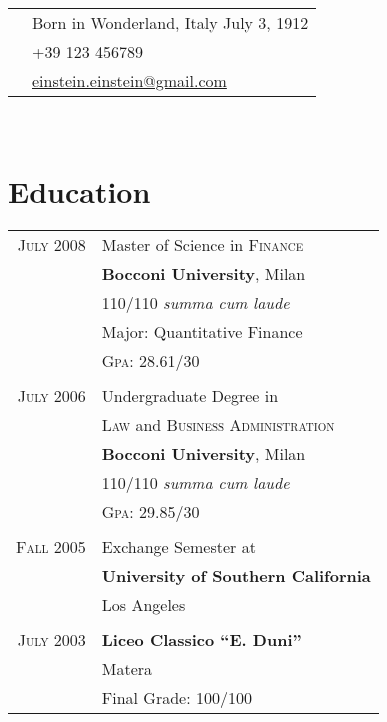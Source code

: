 \documentclass[10pt]{article}
\begin{document}
{\begin{minipage}[t]{0.5\textwidth}
\end{minipage} %
\hfill
\begin{minipage}[t]{0.44\textwidth} %
	
	\vspace{0pt} %
	
\colorbox{shade}{\textcolor{text1}{
	\begin{tabular}{c|p{6.8cm}}
								& Born in Wonderland, Italy July 3, 1912 \\
		\raisebox{-3pt}{\Phone}  		&+39 123 456789\\
		\raisebox{-3pt}{\Envelope} 	&\href{mailto:albert.einstein@gmail.com}
								{einstein.einstein@gmail.com}
	\end{tabular}
	}
}\\[10pt]

\section{Education}

\begin{tabular}{rl}
 	
	\textsc{July} 2008 & Master of Science in \textsc{Finance}\\
	 & \textbf{Bocconi University}, Milan\\
	 & 110/110 \small\emph{summa cum laude}\\
	 & Major: Quantitative Finance\\
	 &\normalsize \textsc{Gpa}: 28.61/30\\
	 &\\
	\textsc{July} 2006 & Undergraduate Degree in\\
	 & \textsc{Law} and \textsc{Business Administration}\\
	 & \textbf{Bocconi University}, Milan\\
	 &110/110 \small\emph{summa cum laude}\\
	 &\normalsize \textsc{Gpa}: 29.85/30\\
	 &\\
	\textsc{Fall} 2005& Exchange Semester at \\
	& \textbf{University of Southern California} \\
	&Los Angeles\\
	&\\
	\textsc{July} 2003& \textbf{Liceo Classico ``E. Duni''}\\
	& Matera\\
	& Final Grade: 100/100


\end{tabular}
\end{minipage}}
\end{document}
